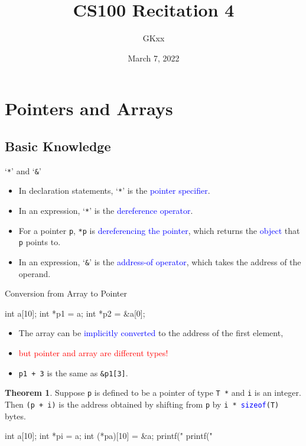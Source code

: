 \documentclass{beamer}
\title{CS100 Recitation 4}
\author{GKxx}
\date{March 7, 2022}
\newcommand{\red}[1]{\textcolor{red}{#1}}
\newcommand{\blue}[1]{\textcolor{blue}{#1}}
\newcommand{\ttt}[1]{\texttt{#1}}
\newcommand{\bluett}[1]{\blue{\ttt{#1}}}
\theoremstyle{definition}
\newtheorem{thm}{Theorem}
\begin{document}
\begin{frame}
    \titlepage
\end{frame}


\section{Pointers and Arrays}

\subsection{Basic Knowledge}

\begin{frame}{`\ttt{*}' and `\ttt{\&}'}
    \begin{itemize}
        \item In declaration statements, `\ttt{*}' is the \blue{pointer specifier}.
        \item In an expression, `\ttt{*}' is the \blue{dereference operator}.
        \item For a pointer \ttt{p}, \ttt{*p} is \blue{dereferencing the pointer}, which returns the \blue{object} that \ttt{p} points to.
        \item In an expression, `\ttt{\&}' is the \blue{address-of operator}, which takes the address of the operand.
    \end{itemize}
\end{frame}

\begin{frame}[fragile]{Conversion from Array to Pointer}
    \begin{cpp}
int a[10];
int *p1 = a;
int *p2 = &a[0];
    \end{cpp}
    \begin{itemize}
        \item The array can be \blue{implicitly converted} to the address of the first element,
        \item \red{but pointer and array are different types!}
        \pause
        \item \ttt{p1 + 3} is the same as \ttt{\&p1[3]}.
    \end{itemize}
\end{frame}

\begin{frame}[fragile]
    \begin{thm}
        Suppose \ttt{p} is defined to be a pointer of type \ttt{T *} and \ttt{i} is an integer. Then \ttt{(p + i)} is the address obtained by shifting from \ttt{p} by \ttt{i * }\bluett{sizeof}\ttt{(T)} bytes.
    \end{thm}
    \pause
    \begin{cpp}
int a[10];
int *pi = a;
int (*pa)[10] = &a;
printf("%
printf("%
    \end{cpp}
\end{frame}
\end{document}
